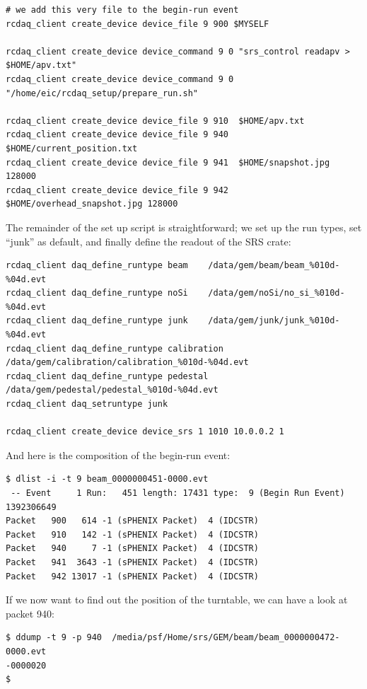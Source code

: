 \documentclass{article}[11pt]
\begin{document}
\begin{verbatim} 
# we add this very file to the begin-run event
rcdaq_client create_device device_file 9 900 $MYSELF

rcdaq_client create_device device_command 9 0 "srs_control readapv > $HOME/apv.txt"
rcdaq_client create_device device_command 9 0 "/home/eic/rcdaq_setup/prepare_run.sh"

rcdaq_client create_device device_file 9 910  $HOME/apv.txt
rcdaq_client create_device device_file 9 940  $HOME/current_position.txt
rcdaq_client create_device device_file 9 941  $HOME/snapshot.jpg 128000
rcdaq_client create_device device_file 9 942  $HOME/overhead_snapshot.jpg 128000
\end{verbatim} 

The remainder of the set up script is straightforward; we set up the run types, 
set ``junk'' as default, and finally define the readout of the SRS crate:

\begin{verbatim} 
rcdaq_client daq_define_runtype beam    /data/gem/beam/beam_%010d-%04d.evt
rcdaq_client daq_define_runtype noSi    /data/gem/noSi/no_si_%010d-%04d.evt
rcdaq_client daq_define_runtype junk    /data/gem/junk/junk_%010d-%04d.evt
rcdaq_client daq_define_runtype calibration /data/gem/calibration/calibration_%010d-%04d.evt
rcdaq_client daq_define_runtype pedestal /data/gem/pedestal/pedestal_%010d-%04d.evt
rcdaq_client daq_setruntype junk

rcdaq_client create_device device_srs 1 1010 10.0.0.2 1
\end{verbatim} 
 
And here is the composition of the begin-run event:

\begin{verbatim} 
$ dlist -i -t 9 beam_0000000451-0000.evt
 -- Event     1 Run:   451 length: 17431 type:  9 (Begin Run Event)  1392306649
Packet   900   614 -1 (sPHENIX Packet)  4 (IDCSTR)
Packet   910   142 -1 (sPHENIX Packet)  4 (IDCSTR)
Packet   940     7 -1 (sPHENIX Packet)  4 (IDCSTR)
Packet   941  3643 -1 (sPHENIX Packet)  4 (IDCSTR)
Packet   942 13017 -1 (sPHENIX Packet)  4 (IDCSTR)
\end{verbatim} 

If we now want to find out the position of the turntable, we can have  a
look at packet 940:

\begin{verbatim} 
$ ddump -t 9 -p 940  /media/psf/Home/srs/GEM/beam/beam_0000000472-0000.evt
-0000020
$
\end{verbatim} 
\end{document}
